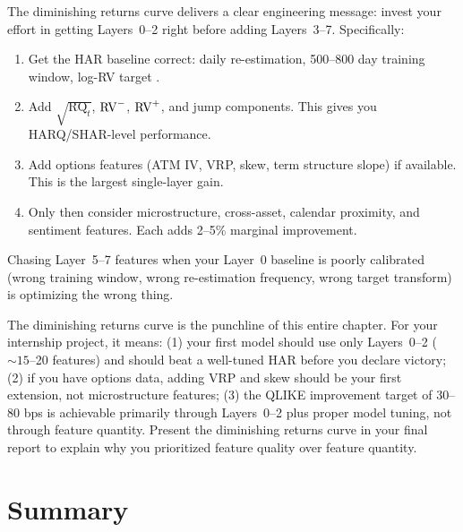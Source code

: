 \begin{keyidea}
The diminishing returns curve delivers a clear engineering message: invest your effort in getting Layers~0--2 right before adding Layers~3--7.
Specifically:
\begin{enumerate}[nosep]
  \item Get the HAR baseline correct: daily re-estimation, 500--800 day training window, log-RV target \citep{HARdToBeat2024}.
  \item Add $\sqrt{\operatorname{RQ}_t}$, $\operatorname{RV}^-$, $\operatorname{RV}^+$, and jump components. This gives you HARQ/SHAR-level performance.
  \item Add options features (ATM IV, VRP, skew, term structure slope) if available. This is the largest single-layer gain.
  \item Only then consider microstructure, cross-asset, calendar proximity, and sentiment features. Each adds 2--5\% marginal improvement.
\end{enumerate}
Chasing Layer~5--7 features when your Layer~0 baseline is poorly calibrated (wrong training window, wrong re-estimation frequency, wrong target transform) is optimizing the wrong thing.
\end{keyidea}

\begin{projectconnection}
The diminishing returns curve is the punchline of this entire chapter.
For your internship project, it means:
(1) your first model should use only Layers~0--2 (${\sim}15$--20 features) and should beat a well-tuned HAR before you declare victory;
(2) if you have options data, adding VRP and skew should be your first extension, not microstructure features;
(3) the QLIKE improvement target of 30--80 bps is achievable primarily through Layers~0--2 plus proper model tuning, not through feature quantity.
Present the diminishing returns curve in your final report to explain why you prioritized feature quality over feature quantity.
\end{projectconnection}

\section{Summary}\label{sec:feat-summary}

